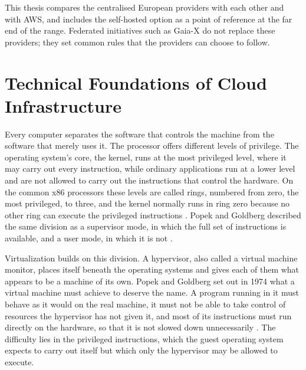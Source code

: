 This thesis compares the centralised European providers with each other and with
\acs{AWS}, and includes the self-hosted option as a point of reference at the far
end of the range. Federated initiatives such as Gaia-X do not replace these
providers; they set common rules that the providers can choose to follow.

\section{Technical Foundations of Cloud Infrastructure}
\label{sec:technical-foundations}

Every computer separates the software that controls the machine from the
software that merely uses it. The processor offers different levels of privilege.
The operating system's core, the kernel, runs at the most privileged level, where
it may carry out every instruction, while ordinary applications run at a lower
level and are not allowed to carry out the instructions that control the hardware.
On the common x86 processors these levels are called rings, numbered from zero,
the most privileged, to three, and the kernel normally runs in ring zero because
no other ring can execute the privileged instructions \cite{Barham_Xen_2003}.
Popek and Goldberg described the same division as a supervisor mode, in which the
full set of instructions is available, and a user mode, in which it is not
\cite{Popek_Goldberg_1974}.

Virtualization builds on this division. A hypervisor, also called a virtual
machine monitor, places itself beneath the operating systems and gives each of them
what appears to be a machine of its own. Popek and Goldberg set out in 1974 what a
virtual machine must achieve to deserve the name. A program running in it must
behave as it would on the real machine, it must not be able to take control of
resources the hypervisor has not given it, and most of its instructions must run
directly on the hardware, so that it is not slowed down unnecessarily
\cite{Popek_Goldberg_1974}. The difficulty lies in the privileged instructions, which
the guest operating system expects to carry out itself but which only the
hypervisor may be allowed to execute.

